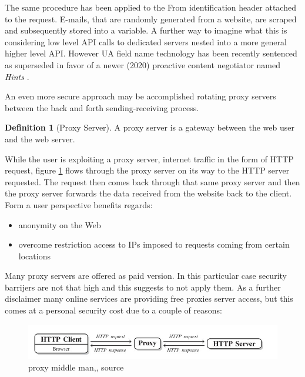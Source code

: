 \documentclass[
  12pt,
  a4paper,
  oneside]{book}
\providecommand{\tightlist}{%
  \setlength{\itemsep}{0pt}\setlength{\parskip}{0pt}}
\theoremstyle{definition}
\newtheorem{definition}{Definition}[chapter]
\theoremstyle{definition}
\theoremstyle{definition}
\theoremstyle{remark}
\begin{document}
The same procedure has been applied to the From identification header attached to the request. E-mails, that are randomly generated from a website, are scraped and subsequently stored into a variable. A further way to imagine what this is considering low level API calls to dedicated servers nested into a more general higher level API.
However UA field name technology has been recently sentenced as superseded in favor of a newer (2020) proactive content negotiator named \emph{Hints} \citet{wiki:UserAgentHints}.

An even more secure approach may be accomplished rotating proxy servers between the back and forth sending-receiving process.
\begin{definition}[Proxy Server]
\protect\hypertarget{def:proxy}{}{\label{def:proxy} {} }A proxy server is a gateway between the web user and the web server.
\end{definition}
While the user is exploiting a proxy server, internet traffic in the form of HTTP request, figure \ref{fig:proxycommunication} flows through the proxy server on its way to the HTTP server requested. The request then comes back through that same proxy server and then the proxy server forwards the data received from the website back to the client.
Form a user perspective benefits regards:

\begin{itemize}
\tightlist
\item
  anonymity on the Web
\item
  overcome restriction access to IPs imposed to requests coming from certain locations
\end{itemize}

Many proxy servers are offered as paid version. In this particular case security barrijers are not that high and this suggests to not apply them. As a further disclaimer many online services are providing free proxies server access, but this comes at a personal security cost due to a couple of reasons:

\begin{figure}
\centering
\includegraphics{images/proxy_schema.jpg}
\caption{\label{fig:proxycommunication} proxy middle man,, source \citet{automateddatacollection}}
\end{figure}
\end{document}
